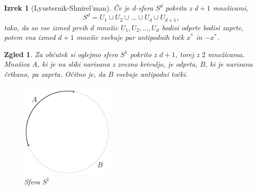 \documentclass[a4paper,12pt]{article}
\newtheorem{izrek}{Izrek}
\newtheorem{zgled}{Zgled}
\begin{document}
\begin{izrek}[Lyusternik-Shnirel'man]
Če je $d$-sfera $S^d$ pokrita z $d+1$ množicami,
$$S^d = U_1 \cup U_2 \cup \ldots \cup U_d \cup U_{d+1},$$
tako, da so vse izmed prvih $d$ množic $U_1, U_2, \ldots, U_d$ bodisi odprte bodisi zaprte, potem ena izmed $d+1$ množic vsebuje par antipodnih točk $x^*$ in $-x^*$.
\end{izrek}


\begin{zgled}{Za občutek si oglejmo sfero $S^1$ pokrito z $d+1$, torej z $2$ množicama. Množica $A$, ki je na sliki narisana z zvezno krivuljo, je odprta, $B$, ki je narisana črtkano, pa zaprta. Očitno je, da $B$ vsebuje antipodni točki. 
\begin{figure}[h!]
\centering
\includegraphics[width=0.4\textwidth]{sfera_s1}
\caption{Sfera $S^1$}
\end{figure}
}
\end{zgled}

\newpage
\end{document}
